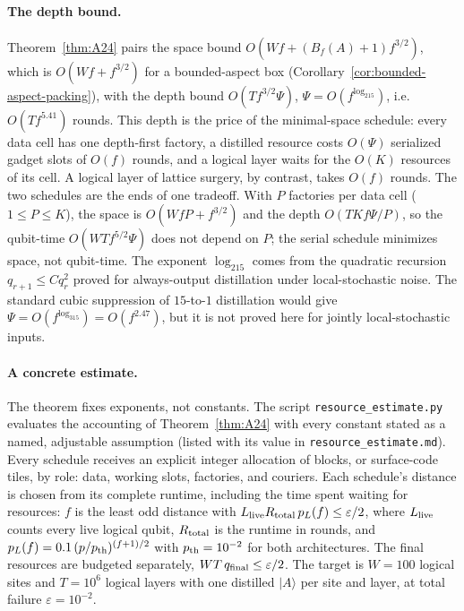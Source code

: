 \documentclass[aps,prx,reprint,superscriptaddress,nofootinbib,floatfix,longbibliography]{revtex4-2}
\theoremstyle{definition}
\begin{document}
\paragraph{The depth bound.}
Theorem~\ref{thm:A24} pairs the space bound $O(Wf+(B_f(A)+1)f^{3/2})$, which is
$O(Wf+f^{3/2})$ for a bounded-aspect box
(Corollary~\ref{cor:bounded-aspect-packing}), with the depth
bound $O(Tf^{3/2}\Psi)$, $\Psi=O(f^{\log_215})$, i.e.\ $O(Tf^{5.41})$ rounds.
This depth is the price of the minimal-space schedule: every data cell has
one depth-first factory, a distilled resource costs $O(\Psi)$ serialized
gadget slots of $O(f)$ rounds, and a logical layer waits for the $O(K)$
resources of its cell.  A logical layer of lattice surgery, by contrast,
takes $O(f)$ rounds.  The two schedules are the ends of one tradeoff.  With
$P$ factories per data cell ($1\le P\le K$), the space is
$O(WfP+f^{3/2})$ and the depth $O(TKf\Psi/P)$, so the qubit-time
$O(WTf^{5/2}\Psi)$ does not depend on $P$; the serial schedule minimizes
space, not qubit-time.  The exponent $\log_215$ comes from the quadratic
recursion $q_{r+1}\le C q_r^2$ proved for always-output distillation under
local-stochastic noise.  The standard cubic suppression of $15$-to-$1$
distillation would give $\Psi=O(f^{\log_315})=O(f^{2.47})$, but it is not
proved here for jointly local-stochastic inputs.

\paragraph{A concrete estimate.}
The theorem fixes exponents, not constants.  The script
\texttt{resource\_estimate.py} evaluates the accounting of
Theorem~\ref{thm:A24} with every constant stated as a named, adjustable
assumption (listed with its value in \nolinkurl{resource_estimate.md}).  Every
schedule receives an explicit integer allocation of blocks, or surface-code
tiles, by role: data, working slots, factories, and couriers.  Each schedule's
distance is chosen from its complete runtime, including the time spent
waiting for resources: $f$ is the least odd distance with
$L_{\rm live}R_{\rm total}\,p_L(f)\le\varepsilon/2$, where $L_{\rm live}$ counts
every live logical qubit, $R_{\rm total}$ is the runtime in rounds, and
$p_L(f)=0.1\,(p/p_{\rm th})^{(f+1)/2}$ with $p_{\rm th}=10^{-2}$ for both
architectures.  The final resources are budgeted separately,
$WT\,q_{\rm final}\le\varepsilon/2$.  The target is $W=100$ logical sites and
$T=10^6$ logical layers with one distilled $|A\rangle$ per site and layer, at
total failure $\varepsilon=10^{-2}$.
\end{document}
